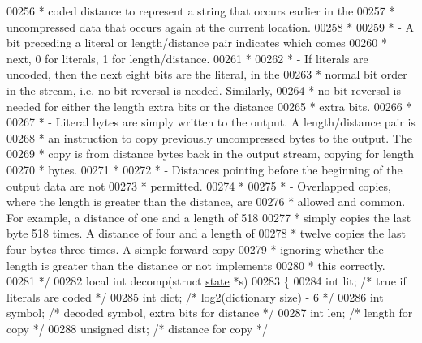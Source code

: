 \begin{DoxyCode}
00256 \textcolor{comment}{ *   coded distance to represent a string that occurs earlier in the}
00257 \textcolor{comment}{ *   uncompressed data that occurs again at the current location.}
00258 \textcolor{comment}{ *}
00259 \textcolor{comment}{ * - A bit preceding a literal or length/distance pair indicates which comes}
00260 \textcolor{comment}{ *   next, 0 for literals, 1 for length/distance.}
00261 \textcolor{comment}{ *}
00262 \textcolor{comment}{ * - If literals are uncoded, then the next eight bits are the literal, in the}
00263 \textcolor{comment}{ *   normal bit order in the stream, i.e. no bit-reversal is needed. Similarly,}
00264 \textcolor{comment}{ *   no bit reversal is needed for either the length extra bits or the distance}
00265 \textcolor{comment}{ *   extra bits.}
00266 \textcolor{comment}{ *}
00267 \textcolor{comment}{ * - Literal bytes are simply written to the output.  A length/distance pair is}
00268 \textcolor{comment}{ *   an instruction to copy previously uncompressed bytes to the output.  The}
00269 \textcolor{comment}{ *   copy is from distance bytes back in the output stream, copying for length}
00270 \textcolor{comment}{ *   bytes.}
00271 \textcolor{comment}{ *}
00272 \textcolor{comment}{ * - Distances pointing before the beginning of the output data are not}
00273 \textcolor{comment}{ *   permitted.}
00274 \textcolor{comment}{ *}
00275 \textcolor{comment}{ * - Overlapped copies, where the length is greater than the distance, are}
00276 \textcolor{comment}{ *   allowed and common.  For example, a distance of one and a length of 518}
00277 \textcolor{comment}{ *   simply copies the last byte 518 times.  A distance of four and a length of}
00278 \textcolor{comment}{ *   twelve copies the last four bytes three times.  A simple forward copy}
00279 \textcolor{comment}{ *   ignoring whether the length is greater than the distance or not implements}
00280 \textcolor{comment}{ *   this correctly.}
00281 \textcolor{comment}{ */}
00282 local \textcolor{keywordtype}{int} decomp(\textcolor{keyword}{struct} \hyperlink{structstate}{state} *s)
00283 \{
00284     \textcolor{keywordtype}{int} lit;            \textcolor{comment}{/* true if literals are coded */}
00285     \textcolor{keywordtype}{int} dict;           \textcolor{comment}{/* log2(dictionary size) - 6 */}
00286     \textcolor{keywordtype}{int} symbol;         \textcolor{comment}{/* decoded symbol, extra bits for distance */}
00287     \textcolor{keywordtype}{int} len;            \textcolor{comment}{/* length for copy */}
00288     \textcolor{keywordtype}{unsigned} dist;      \textcolor{comment}{/* distance for copy */}

\end{DoxyCode}
